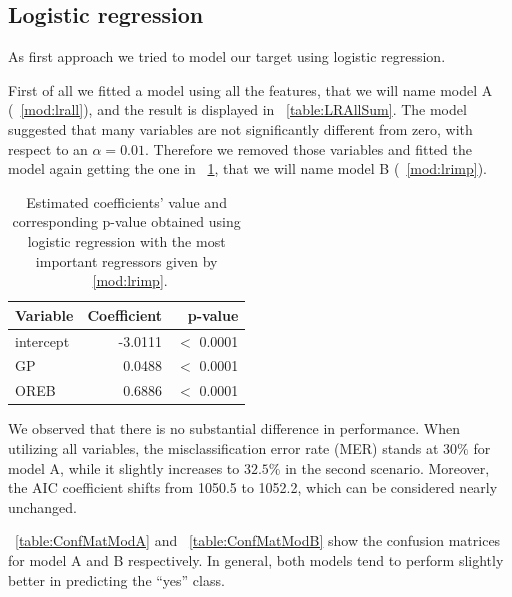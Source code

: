 \subsection{Logistic regression}\label{appendix:lr}

As first approach we tried to model our target using logistic regression.

First of all we fitted a model using all the features, that we will name model A (\Mod~\ref{mod:lrall}), and the result is displayed in \Tab~\ref{table:LRAllSum}. The model suggested that many variables are not significantly different from zero, with respect to an $\alpha = 0.01$. Therefore we removed those variables and fitted the model again getting the one in \Tab~\ref{table:LRImpSum}, that we will name model B (\Mod~\ref{mod:lrimp}).

\begin{center}
\end{center}

\begin{table}[h]
	\centering
	\begin{tabular}{|| l | r | r ||} 
		\hline
		Variable & Coefficient & p-value \\
		\hline
		\hline
		intercept & -3.0111 & $<$ 0.0001 \\
		GP & 0.0488 & $<$ 0.0001 \\
		OREB & 0.6886 & $<$ 0.0001 \\	
		\hline
	\end{tabular}
	\caption{Estimated coefficients' value and corresponding p-value obtained using logistic regression with the most important regressors given by \Mod~\ref{mod:lrimp}.}
	\label{table:LRImpSum}
\end{table}

We observed that there is no substantial difference in performance. When utilizing all variables, the misclassification error rate (MER) stands at $30\%$ for model A, while it slightly increases to $32.5\%$ in the second scenario. Moreover, the AIC coefficient shifts from 1050.5 to 1052.2, which can be considered nearly unchanged.

\Tab~\ref{table:ConfMatModA} and \Tab~\ref{table:ConfMatModB} show the confusion matrices for model A and B respectively. In general, both models tend to perform slightly better in predicting the ``yes'' class.


